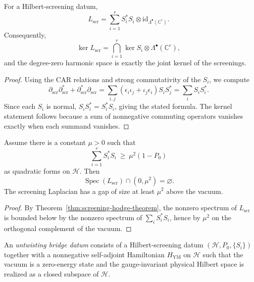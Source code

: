 \begin{theorem}
\label{thm:screening-hodge-theorem}
For a Hilbert-screening datum,
\[
L_{\mathrm{scr}}=\sum_{i=1}^r S_i^*S_i\otimes \mathrm{id}_{\Lambda^{\bullet}(\mathbb C^r)}.
\]
Consequently,
\[
\ker L_{\mathrm{scr}} = \bigcap_{i=1}^r \ker S_i \otimes \Lambda^{\bullet}(\mathbb C^r),
\]
and the degree-zero harmonic space is exactly the joint kernel of the screenings.
\end{theorem}

\begin{proof}
Using the CAR relations and strong commutativity of the $S_i$, we compute
\[
\partial_{\mathrm{scr}}\partial_{\mathrm{scr}}^*+\partial_{\mathrm{scr}}^*\partial_{\mathrm{scr}}
=
\sum_{i,j}(\epsilon_i\iota_j+\iota_j\epsilon_i)S_iS_j^*
=
\sum_i S_iS_i^*.
\]
Since each $S_i$ is normal, $S_iS_i^*=S_i^*S_i$, giving the stated formula. The kernel statement follows
because a sum of nonnegative commuting operators vanishes exactly when each summand vanishes.
\end{proof}

\begin{corollary}
\label{cor:screening-spectral-gap-criterion}
Assume there is a constant $\mu>0$ such that
\[
\sum_{i=1}^r S_i^*S_i\ \ge\ \mu^2(1-P_0)
\]
as quadratic forms on $\mathcal H$.
Then
\[
\operatorname{Spec}(L_{\mathrm{scr}})\cap (0,\mu^2)=\varnothing.
\]
The screening Laplacian has a gap of size at least $\mu^2$ above the vacuum.
\end{corollary}

\begin{proof}
By Theorem~\ref{thm:screening-hodge-theorem}, the nonzero spectrum of $L_{\mathrm{scr}}$ is bounded below by the
nonzero spectrum of $\sum_i S_i^*S_i$, hence by $\mu^2$ on the orthogonal complement of the vacuum.
\end{proof}

\begin{definition}
\label{def:untwisting-bridge-datum}
An \emph{untwisting bridge datum} consists of a Hilbert-screening datum $(\mathcal H,P_0,\{S_i\})$
together with a nonnegative self-adjoint Hamiltonian $H_{\mathrm{YM}}$ on $\mathcal H$ such that the vacuum
is a zero-energy state and the gauge-invariant physical Hilbert space is realized as a closed subspace of $\mathcal H$.
\end{definition}

